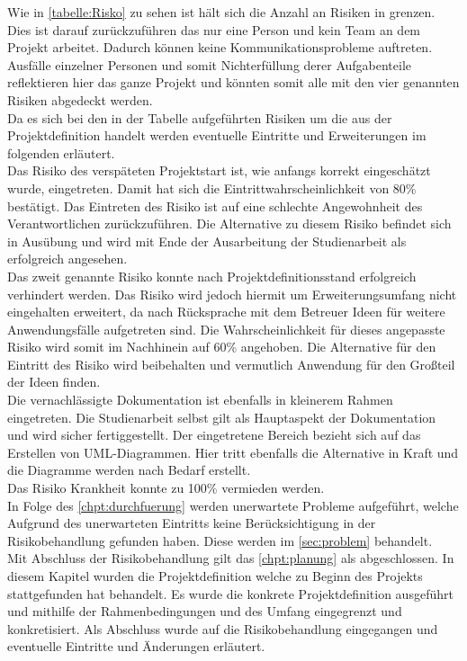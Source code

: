 Wie in \autoref{tabelle:Risko} zu sehen ist hält sich die Anzahl an Risiken in grenzen. Dies ist darauf zurückzuführen das nur eine Person und kein Team an dem Projekt arbeitet. Dadurch können \zB keine Kommunikationsprobleme auftreten. Ausfälle einzelner Personen und somit Nichterfüllung derer Aufgabenteile reflektieren hier das ganze Projekt und könnten somit alle mit den vier genannten Risiken abgedeckt werden.\\
Da es sich bei den in der Tabelle aufgeführten Risiken um die aus der Projektdefinition handelt werden eventuelle Eintritte und Erweiterungen im folgenden erläutert.\\
Das Risiko des verspäteten Projektstart ist, wie anfangs korrekt eingeschätzt wurde, eingetreten. Damit hat sich die Eintrittwahrscheinlichkeit von 80\% bestätigt. Das Eintreten des Risiko ist auf eine schlechte Angewohnheit des Verantwortlichen zurückzuführen. Die Alternative zu diesem Risiko befindet sich in Ausübung und wird mit Ende der Ausarbeitung der Studienarbeit als erfolgreich angesehen.\\
Das zweit genannte Risiko konnte nach Projektdefinitionsstand erfolgreich verhindert werden. Das Risiko wird jedoch hiermit um \glqq Erweiterungsumfang nicht eingehalten\grqq{} erweitert, da nach Rücksprache mit dem Betreuer Ideen für weitere Anwendungsfälle aufgetreten sind. Die Wahrscheinlichkeit für dieses angepasste Risiko wird somit im Nachhinein auf 60\% angehoben. Die Alternative für den Eintritt des Risiko wird beibehalten und vermutlich Anwendung für den Großteil der Ideen finden.\\
Die vernachlässigte Dokumentation ist ebenfalls in kleinerem Rahmen eingetreten. Die Studienarbeit selbst gilt als Hauptaspekt der Dokumentation und wird sicher fertiggestellt. Der eingetretene Bereich bezieht sich auf das Erstellen von \ac{UML}-Diagrammen. Hier tritt ebenfalls die Alternative in Kraft und die Diagramme werden nach Bedarf erstellt.\\
Das Risiko Krankheit konnte zu 100\% vermieden werden.\\
In Folge des \autoref{chpt:durchfuerung}  werden unerwartete Probleme aufgeführt, welche Aufgrund des unerwarteten Eintritts keine Berücksichtigung in der Risikobehandlung gefunden haben. Diese werden im \autoref{sec:problem}  behandelt.\\

Mit Abschluss der Risikobehandlung gilt das \autoref{chpt:planung}  als abgeschlossen. In diesem Kapitel wurden die Projektdefinition welche zu Beginn des Projekts stattgefunden hat behandelt. Es wurde die konkrete Projektdefinition ausgeführt und mithilfe der Rahmenbedingungen und des Umfang eingegrenzt und konkretisiert. Als Abschluss wurde auf die Risikobehandlung eingegangen und eventuelle Eintritte und Änderungen erläutert.